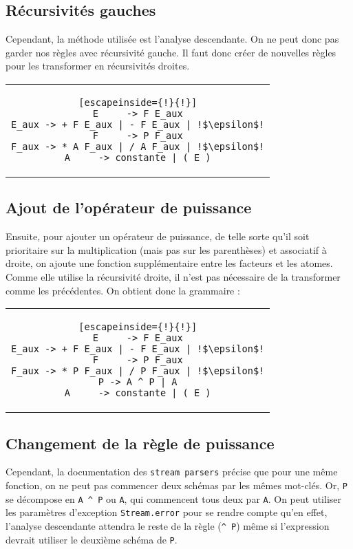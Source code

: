 \documentclass[11pt]{article}
\begin{document}
\subsection{Récursivités gauches}
Cependant, la méthode utilisée est l'analyse descendante. On ne peut donc pas garder nos règles avec récursivité gauche. Il faut donc créer de nouvelles règles pour les transformer en récursivités droites.
\begin{center}
\begin{tabular}{c}
\begin{lstlisting}[escapeinside={!}{!}]
E     -> F E_aux
E_aux -> + F E_aux | - F E_aux | !$\epsilon$!
F     -> P F_aux
F_aux -> * A F_aux | / A F_aux | !$\epsilon$!
A     -> constante | ( E )
\end{lstlisting}
\end{tabular}
\end{center}


\subsection{Ajout de l'opérateur de puissance}
Ensuite, pour ajouter un opérateur de puissance, de telle sorte qu'il soit prioritaire sur la multiplication (mais pas sur les parenthèses) et associatif à droite, on ajoute une fonction supplémentaire entre les facteurs et les atomes. Comme elle utilise la récursivité droite, il n'est pas nécessaire de la transformer comme les précédentes. On obtient donc la grammaire : 
\begin{center}
\begin{tabular}{c}
\begin{lstlisting}[escapeinside={!}{!}]
E     -> F E_aux
E_aux -> + F E_aux | - F E_aux | !$\epsilon$!
F     -> P F_aux
F_aux -> * P F_aux | / P F_aux | !$\epsilon$!
P -> A ^ P | A
A     -> constante | ( E )
\end{lstlisting}
\end{tabular}
\end{center}

\subsection{Changement de la règle de puissance}
Cependant, la documentation des \texttt{stream parsers} précise que pour une même fonction, on ne peut pas commencer deux schémas par les mêmes mot-clés. Or, \lstinline{P} se décompose en \lstinline{A ^ P} ou \lstinline{A}, qui commencent tous deux par \lstinline{A}. On peut utiliser les paramètres d'exception \texttt{Stream.error} pour se rendre compte qu'en effet, l'analyse descendante attendra le reste de la règle (\lstinline{^ P}) même si l'expression devrait utiliser le deuxième schéma de \lstinline{P}.
\end{document}
